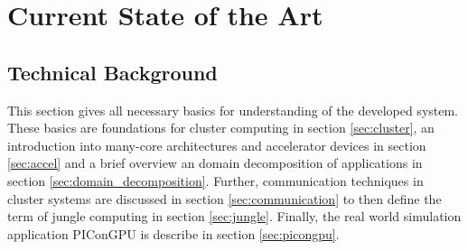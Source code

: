 \chapter{Current State of the Art}
\label{sec:state}






\section{Technical Background}
This section gives all necessary basics for understanding of the
developed system.  These basics are foundations for cluster computing
in section \ref{sec:cluster}, an introduction into many-core
architectures and accelerator devices in section \ref{sec:accel} and
a brief overview an domain decomposition of applications in section
\ref{sec:domain_decomposition}. Further, communication techniques in
cluster systems are discussed in section \ref{sec:communication} to then
define the term of jungle computing in section \ref{sec:jungle}. Finally, the
real world simulation application PIConGPU is describe in section \ref{sec:picongpu}.

